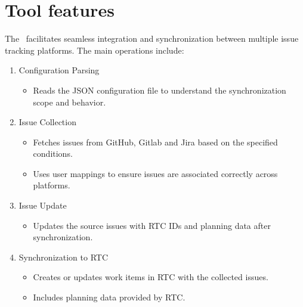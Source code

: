



\hypertarget{tool-features}{%
\section{Tool features}\label{tool-features}}

The \pkg\ facilitates seamless integration and synchronization between multiple
issue tracking platforms. The main operations include:

\begin{enumerate}
   \item Configuration Parsing
         \begin{itemize}
            \item Reads the JSON configuration file to understand the
                  synchronization scope and behavior.
         \end{itemize}

   \item Issue Collection
         \begin{itemize}
            \item Fetches issues from GitHub, Gitlab and Jira based on the
                  specified conditions.
            \item Uses user mappings to ensure issues are associated correctly
                  across platforms.
         \end{itemize}

   \item Issue Update
         \begin{itemize}
            \item Updates the source issues with RTC IDs and planning data after
                  synchronization.
         \end{itemize}

   \item Synchronization to RTC
         \begin{itemize}
            \item Creates or updates work items in RTC with the collected issues.
            \item Includes planning data provided by RTC.
         \end{itemize}
\end{enumerate}

